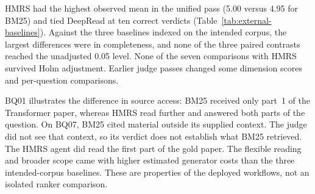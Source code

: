 HMRS had the highest observed mean in the unified pass (5.00 versus
4.95 for BM25) and tied DeepRead at ten correct verdicts
(Table~\ref{tab:external-baselines}). Against the three baselines indexed
on the intended corpus, the largest differences were in completeness,
and none of the three paired contrasts reached the unadjusted 0.05 level.
None of the seven comparisons with HMRS survived Holm adjustment. Earlier
judge passes changed some dimension scores and per-question comparisons.

BQ01 illustrates the difference in source access: BM25 received only part~1
of the Transformer paper, whereas HMRS read further and answered both
parts of the question. On BQ07, BM25 cited material outside its supplied context. The judge
did not see that context, so its verdict does not establish what BM25
retrieved. The HMRS agent did read the first part of the gold
paper. The flexible reading and broader scope came with higher estimated
generator costs than the three intended-corpus baselines. These are
properties of the deployed workflows, not an isolated ranker comparison.
